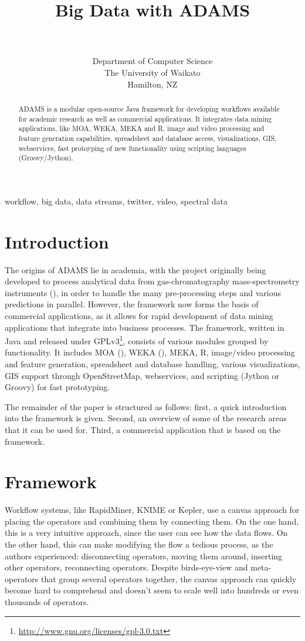 \documentclass[wcp]{jmlr}
\title[Big Data with ADAMS]{Big Data with ADAMS}
\author{\Name{Peter Reutemann} \Email{fracpete@waikato.ac.nz} \\
  \Name{Geoff Holmes} \Email{geoff@waikato.ac.nz}\\
  \addr Department of Computer Science \\
  The University of Waikato \\
  Hamilton, NZ
 }
\begin{document}
\maketitle

\begin{abstract}
ADAMS is a modular open-source Java framework for developing workflows available for
academic research as well as commercial applications. It integrates
data mining applications, like MOA, WEKA, MEKA and R, image and video
processing and feature generation capabilities, spreadsheet and database
access, visualizations, GIS, webservices, fast protoyping of new 
functionality using scripting languages (Groovy/Jython).
\end{abstract}
\begin{keywords}
workflow, big data, data streams, twitter, video, spectral data
\end{keywords}

\section{Introduction}
The origins of ADAMS lie in academia, with the project originally being developed to process analytical data from gas-chromatography mass-spectrometry instruments (\cite{gcms}), in order to handle the many pre-processing steps and various predictions in parallel. However, the framework now forms the basis of commercial applications, as it allows for rapid development of data mining applications that integrate into business processes. The framework, written in Java and released under GPLv3\footnote{\url{http://www.gnu.org/licenses/gpl-3.0.txt}{}}, consists of various modules grouped by functionality. It includes MOA (\cite{moa}), WEKA (\cite{weka}), MEKA, R, image/video processing and feature generation, spreadsheet and database handling, various visualizations, GIS support through OpenStreetMap, webservices, and scripting (Jython or Groovy) for fast prototyping.

The remainder of the paper is structured as follows: first, a quick introduction into the framework is given. Second, an overview of some of the research areas that it can be used for. Third, a commercial application that is based on the framework.

\section{Framework}
Workflow systems, like RapidMiner, KNIME or Kepler, use a canvas approach for placing the operators and combining them by connecting them. On the one hand, this is a very intuitive approach, since the user can see how the data flows. On the other hand, this can make modifying the flow a tedious process, as the authors experienced: disconnecting operators, moving them around, inserting other operators, reconnecting operators. Despite birds-eye-view and meta-operators that group several operators together, the canvas approach can quickly become hard to comprehend and doesn't seem to scale well into hundreds or even thousands of operators.
\end{document}
